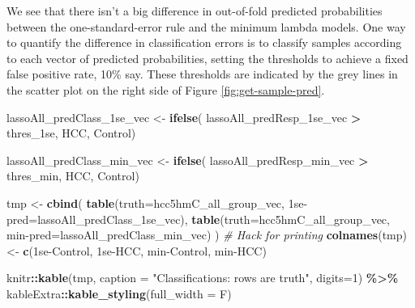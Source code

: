 \documentclass[
]{book}
\newenvironment{Shaded}{\begin{snugshade}}{\end{snugshade}}
\newcommand{\CommentTok}[1]{\textcolor[rgb]{0.56,0.35,0.01}{\textit{#1}}}
\newcommand{\DataTypeTok}[1]{\textcolor[rgb]{0.13,0.29,0.53}{#1}}
\newcommand{\DecValTok}[1]{\textcolor[rgb]{0.00,0.00,0.81}{#1}}
\newcommand{\KeywordTok}[1]{\textcolor[rgb]{0.13,0.29,0.53}{\textbf{#1}}}
\newcommand{\NormalTok}[1]{#1}
\newcommand{\OperatorTok}[1]{\textcolor[rgb]{0.81,0.36,0.00}{\textbf{#1}}}
\newcommand{\StringTok}[1]{\textcolor[rgb]{0.31,0.60,0.02}{#1}}
\begin{document}
We see that there isn't a big difference in out-of-fold predicted
probabilities between the one-standard-error rule and the minimum lambda models.
One way to quantify
the difference in classification errors is to classify samples
according to each vector of predicted probabilities, setting
the thresholds to achieve a fixed false positive rate, 10\% say.
These thresholds are indicated by the grey lines in the scatter plot
on the right side of Figure \ref{fig:get-sample-pred}.

\begin{Shaded}
\begin{Highlighting}[]
\NormalTok{lassoAll\_predClass\_1se\_vec <{-}}\StringTok{ }\KeywordTok{ifelse}\NormalTok{(}
\NormalTok{ lassoAll\_predResp\_1se\_vec }\OperatorTok{>}\StringTok{ }\NormalTok{thres\_1se, }\StringTok{\textquotesingle{}HCC\textquotesingle{}}\NormalTok{, }\StringTok{\textquotesingle{}Control\textquotesingle{}}\NormalTok{)}

\NormalTok{lassoAll\_predClass\_min\_vec <{-}}\StringTok{ }\KeywordTok{ifelse}\NormalTok{(}
\NormalTok{ lassoAll\_predResp\_min\_vec }\OperatorTok{>}\StringTok{ }\NormalTok{thres\_min, }\StringTok{\textquotesingle{}HCC\textquotesingle{}}\NormalTok{, }\StringTok{\textquotesingle{}Control\textquotesingle{}}\NormalTok{)}

\NormalTok{tmp <{-}}\StringTok{ }\KeywordTok{cbind}\NormalTok{(}
 \KeywordTok{table}\NormalTok{(}\DataTypeTok{truth=}\NormalTok{hcc5hmC\_all\_group\_vec, }\StringTok{\textasciigrave{}}\DataTypeTok{1se{-}pred}\StringTok{\textasciigrave{}}\NormalTok{=lassoAll\_predClass\_1se\_vec),}
 \KeywordTok{table}\NormalTok{(}\DataTypeTok{truth=}\NormalTok{hcc5hmC\_all\_group\_vec, }\StringTok{\textasciigrave{}}\DataTypeTok{min{-}pred}\StringTok{\textasciigrave{}}\NormalTok{=lassoAll\_predClass\_min\_vec)}
\NormalTok{) }
\CommentTok{\# Hack for printing}
\KeywordTok{colnames}\NormalTok{(tmp) <{-}}\StringTok{ }\KeywordTok{c}\NormalTok{(}\StringTok{\textquotesingle{}1se{-}Control\textquotesingle{}}\NormalTok{, }\StringTok{\textquotesingle{}1se{-}HCC\textquotesingle{}}\NormalTok{, }\StringTok{\textquotesingle{}min{-}Control\textquotesingle{}}\NormalTok{, }\StringTok{\textquotesingle{}min{-}HCC\textquotesingle{}}\NormalTok{)}

\NormalTok{knitr}\OperatorTok{::}\KeywordTok{kable}\NormalTok{(tmp,}
  \DataTypeTok{caption =} \StringTok{"Classifications: rows are truth"}\NormalTok{,}
  \DataTypeTok{digits=}\DecValTok{1}\NormalTok{) }\OperatorTok{\%>\%}
\StringTok{   }\NormalTok{kableExtra}\OperatorTok{::}\KeywordTok{kable\_styling}\NormalTok{(}\DataTypeTok{full\_width =}\NormalTok{ F)}
\end{Highlighting}
\end{Shaded}
\end{document}
